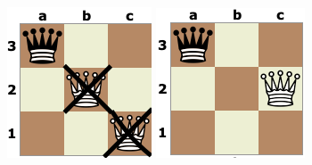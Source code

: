 \documentclass[12pt]{article}
\begin{document}
\begin{figure}[h]
    \begin{minipage}{0.3\textwidth}
        \centering
        \includegraphics[width=\textwidth]{Fig8.png}
    \end{minipage}
    \hspace{0.03\textwidth}
    \begin{minipage}{0.3\textwidth}
        \centering
        \includegraphics[width=\textwidth]{Fig9.png}

\end{minipage}
\end{figure}
\end{document}
